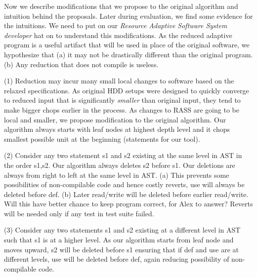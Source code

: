 Now we describe modifications that we propose to the original algorithm and intuition behind the proposals. Later during evaluation, we find some evidence for the intuitions. We need to put on our \emph{Resource Adaptive Software System developer} hat on to understand this modifications. As the reduced adaptive program is a useful artifact that will be used in place of the original software, we hypothesize that (a) it may not be drastically different than the original program. (b) Any reduction that does not compile is useless.

(1)  Reduction may incur many small local changes to software based on the relaxed specifications. As original HDD setups were designed to quickly converge to reduced input that is significantly \emph{smaller} than original input, they tend to make bigger chops earlier in the process. As changes to RASS are going to be local and smaller, we propose modification to the original algorithm. Our algorithm always starts with leaf nodes at highest depth level and it chops smallest possible unit at the beginning (statements for our tool). 

(2) Consider any two statement s1 and s2 existing at the same level in AST in the order s1,s2. Our algorithm always deletes s2 before s1. Our deletions are always from right to left at the same level in AST. (a) This prevents some possibilities of non-compilable code and hence costly reverts, use will always be deleted before def. (b) Later read/write will be deleted before earlier read/write. Will this have better chance to keep program correct, for Alex to answer? Reverts will be needed only if any test in test suite failed.    

(3) Consider any two statements s1 and s2 existing at a different level in AST such that s1 is at a higher level. As our algorithm starts from leaf node and moves upward, s2 will be deleted before s1 ensuring that if def and use are at different levels, use will be deleted before def, again reducing possibility of non-compilable code.  

